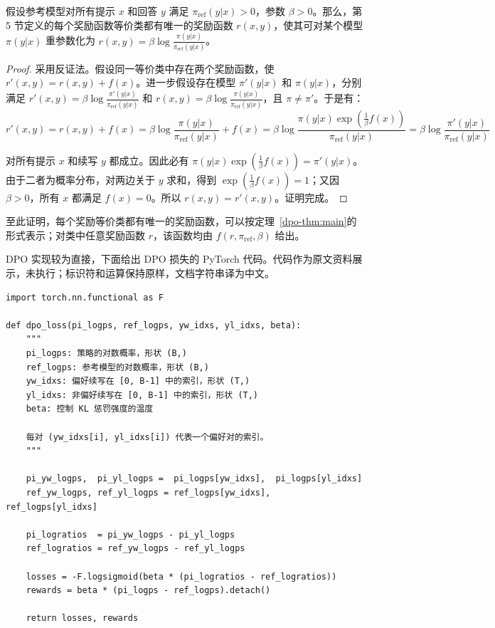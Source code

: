 \begin{proposition}\label{dpo-prop:unique}
假设参考模型对所有提示 $x$ 和回答 $y$ 满足 $\pi_{\mathrm{ref}}(y|x)>0$，参数 $\beta>0$。那么，第 5 节定义的每个奖励函数等价类都有唯一的奖励函数 $r(x,y)$，使其可对某个模型 $\pi(y|x)$ 重参数化为 $r(x,y)=\beta\log\frac{\pi(y|x)}{\pi_{\mathrm{ref}}(y|x)}$。
\end{proposition}
\begin{proof}
采用反证法。假设同一等价类中存在两个奖励函数，使 $r'(x,y)=r(x,y)+f(x)$。进一步假设存在模型 $\pi'(y|x)$ 和 $\pi(y|x)$，分别满足 $r'(x,y)=\beta\log\frac{\pi'(y|x)}{\pi_{\mathrm{ref}}(y|x)}$ 和 $r(x,y)=\beta\log\frac{\pi(y|x)}{\pi_{\mathrm{ref}}(y|x)}$，且 $\pi\ne\pi'$。于是有：
\label{dpo-display-32}
\begin{equation*}
        r'(x, y) = r(x, y) + f(x) = \beta \log \frac{\pi(y|x)}{\pi_{\mathrm{ref}}(y|x)} + f(x) =  \beta \log \frac{\pi(y|x)\exp(\frac{1}{\beta} f(x))}{\pi_{\mathrm{ref}}(y|x)}=\beta \log \frac{\pi'(y|x)}{\pi_{\mathrm{ref}}(y|x)}
    \end{equation*}

对所有提示 $x$ 和续写 $y$ 都成立。因此必有 $\pi(y|x)\exp(\frac1\beta f(x))=\pi'(y|x)$。由于二者为概率分布，对两边关于 $y$ 求和，得到 $\exp(\frac1\beta f(x))=1$；又因 $\beta>0$，所有 $x$ 都满足 $f(x)=0$。所以 $r(x,y)=r'(x,y)$。\newline 证明完成。\qedhere
\end{proof}



至此证明，每个奖励等价类都有唯一的奖励函数，可以按定理~\ref{dpo-thm:main}的形式表示；对类中任意奖励函数 $r$，该函数均由 $f(r,\pi_{\mathrm{ref}},\beta)$ 给出。

DPO 实现较为直接，下面给出 DPO 损失的 PyTorch 代码。代码作为原文资料展示，未执行；标识符和运算保持原样，文档字符串译为中文。
\begin{verbatim}
import torch.nn.functional as F

def dpo_loss(pi_logps, ref_logps, yw_idxs, yl_idxs, beta):
    """
    pi_logps: 策略的对数概率，形状 (B,)
    ref_logps: 参考模型的对数概率，形状 (B,)
    yw_idxs: 偏好续写在 [0, B-1] 中的索引，形状 (T,)
    yl_idxs: 非偏好续写在 [0, B-1] 中的索引，形状 (T,)
    beta: 控制 KL 惩罚强度的温度

    每对 (yw_idxs[i], yl_idxs[i]) 代表一个偏好对的索引。
    """

    pi_yw_logps,  pi_yl_logps =  pi_logps[yw_idxs],  pi_logps[yl_idxs]
    ref_yw_logps, ref_yl_logps = ref_logps[yw_idxs], ref_logps[yl_idxs]

    pi_logratios  = pi_yw_logps - pi_yl_logps
    ref_logratios = ref_yw_logps - ref_yl_logps

    losses = -F.logsigmoid(beta * (pi_logratios - ref_logratios))
    rewards = beta * (pi_logps - ref_logps).detach()

    return losses, rewards
\end{verbatim}

